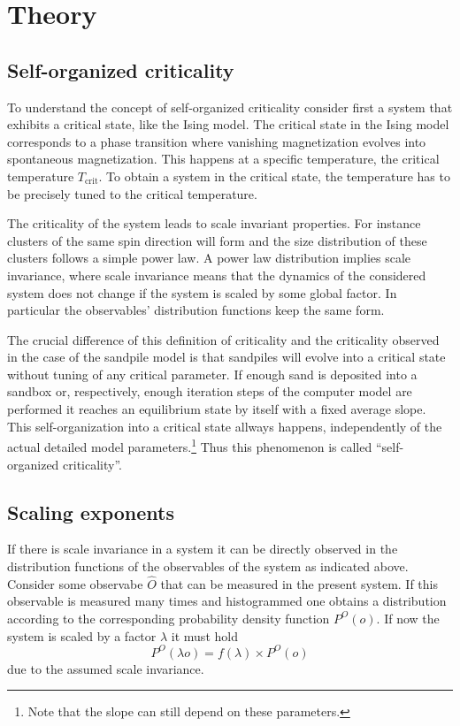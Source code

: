 \section{Theory}
\label{sec:theory}

\subsection{Self-organized criticality}
\label{sec:th:SOC}
To understand the concept of self-organized criticality consider first a system that exhibits a critical state,
like the Ising model. The critical state in the Ising model corresponds to a phase transition where vanishing
magnetization evolves into spontaneous magnetization. This happens at a specific temperature, the critical temperature
$T_{\mathrm{crit}}$. To obtain a system in the critical state, the temperature has to be precisely tuned to the critical
temperature.

The criticality of the system leads to scale invariant properties. For instance clusters of the same spin direction
will form and the size distribution of these clusters follows a simple power law. A power law distribution implies
scale invariance, where scale invariance means that the dynamics of the considered system does not change if the system
is scaled by some global factor. In particular the observables' distribution functions keep the same form.

The crucial difference of this definition of criticality and the criticality observed in the case of the sandpile model
is that sandpiles will evolve into a critical state without tuning of any critical parameter.
If enough sand is deposited into a sandbox or, respectively, enough iteration steps of the computer model are performed
it reaches an equilibrium state by itself with a fixed average slope. This self-organization into a critical state
allways happens, independently of the actual detailed model parameters.\footnote{Note that the slope can still depend
on these parameters.} Thus this phenomenon is called \enquote{self-organized criticality}.

\subsection{Scaling exponents}
\label{sec:th:scaling}
If there is scale invariance in a system it can be directly observed in the distribution functions
of the observables of the system as indicated above. Consider some observabe $\hat{O}$ that can be measured in the
present system. If this observable is measured many times and histogrammed one obtains a distribution according to the
corresponding probability density function $P^{O}(o)$.
If now the system is scaled by a factor $\lambda$ it must hold
\begin{equation}\label{eq:scalingCondition}
P^{O}(\lambda o) = f(\lambda) \times P^{O}(o)
\end{equation}
due to the assumed scale invariance.

